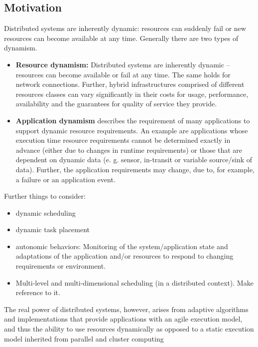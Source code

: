 \documentclass[]{article}
\begin{document}
\subsection{Motivation}

Distributed systems are inherently dynamic: resources can suddenly fail or 
new resources can become available at any time. Generally there are two types
of dynamism.
\begin{itemize}
\item \textbf{Resource dynamism:} Distributed systems are inherently dynamic
     -- resources can become available or fail at any time. The same holds for
      network connections. Further, hybrid infrastructures comprised of 
      different resources classes can vary significantly in their costs for 
      usage, performance, availability and the guarantees for quality of service 
      they provide.
      
\item \textbf{Application dynamism} describes the requirement of many
applications to support dynamic resource requirements. An example are
applications whose execution time resource requirements cannot be determined
exactly in advance (either due to changes in runtime requirements) or those that
are dependent on dynamic data (e. g. sensor, in-transit or variable source/sink
of data). Further, the application requirements may change, due to,
for example, a failure or an application event.
\end{itemize}

Further things to consider:
\begin{itemize}
    \item dynamic scheduling
    \item dynamic task placement
    \item autonomic behaviors: Monitoring of the system/application state and 
    adaptations of the application and/or resources to respond to changing 
    requirements or environment.
  \item Multi-level and multi-dimensional scheduling (in a distributed
    context). Make reference to it.
\end{itemize}

The real power of distributed systems, however, arises from adaptive algorithms
and implementations that provide applications with an agile execution model, and
thus the ability to use resources dynamically as opposed to a static execution
model inherited from parallel and cluster computing
\end{document}
